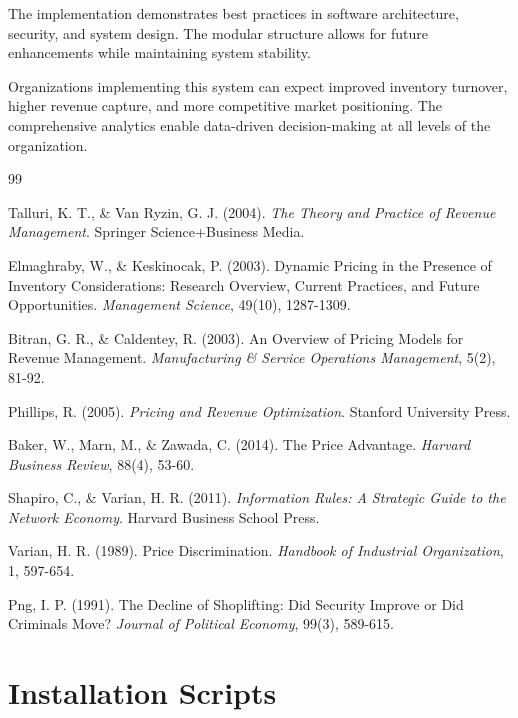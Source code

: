 \documentclass[12pt,a4paper,oneside]{report}
\begin{document}
The implementation demonstrates best practices in software architecture, security, and system design. The modular structure allows for future enhancements while maintaining system stability.

Organizations implementing this system can expect improved inventory turnover, higher revenue capture, and more competitive market positioning. The comprehensive analytics enable data-driven decision-making at all levels of the organization.

\newpage

\begin{thebibliography}{99}

Talluri, K. T., \& Van Ryzin, G. J. (2004). 
\textit{The Theory and Practice of Revenue Management}. 
Springer Science+Business Media.

Elmaghraby, W., \& Keskinocak, P. (2003). 
Dynamic Pricing in the Presence of Inventory Considerations: Research Overview, Current Practices, and Future Opportunities. 
\textit{Management Science}, 49(10), 1287-1309.

Bitran, G. R., \& Caldentey, R. (2003). 
An Overview of Pricing Models for Revenue Management. 
\textit{Manufacturing \& Service Operations Management}, 5(2), 81-92.

Phillips, R. (2005). 
\textit{Pricing and Revenue Optimization}. 
Stanford University Press.

Baker, W., Marn, M., \& Zawada, C. (2014). 
The Price Advantage. 
\textit{Harvard Business Review}, 88(4), 53-60.

Shapiro, C., \& Varian, H. R. (2011). 
\textit{Information Rules: A Strategic Guide to the Network Economy}. 
Harvard Business School Press.

Varian, H. R. (1989). 
Price Discrimination. 
\textit{Handbook of Industrial Organization}, 1, 597-654.

Png, I. P. (1991). 
The Decline of Shoplifting: Did Security Improve or Did Criminals Move? 
\textit{Journal of Political Economy}, 99(3), 589-615.

\end{thebibliography}

\newpage

\appendix

\chapter{Installation Scripts}
\end{document}
